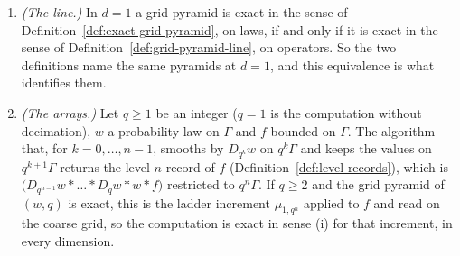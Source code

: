 \begin{proposition}
\label{prop:line-and-arrays}
\leanok
\begin{enumerate}
\item \emph{(The line.)} In $d = 1$ a grid pyramid is exact in the sense of
Definition~\ref{def:exact-grid-pyramid}, on laws, if and only if it is exact in the sense of
Definition~\ref{def:grid-pyramid-line}, on operators. So the two definitions name the same
pyramids at $d = 1$, and this equivalence is what identifies them.
\item \emph{(The arrays.)} Let $q \ge 1$ be an integer ($q = 1$ is the computation without decimation), $w$ a probability law on $\Gamma$ and $f$
bounded on $\Gamma$. The algorithm that, for $k = 0, \dots, n-1$, smooths by $D_{q^k}w$ on
$q^k\Gamma$ and keeps the values on $q^{k+1}\Gamma$ returns the level-$n$ record of $f$
(Definition~\ref{def:level-records}), which is
$\bigl(D_{q^{n-1}}w * \dots * D_qw * w * f\bigr)$ restricted to $q^n\Gamma$. If $q \ge 2$ and the
grid pyramid of $(w, q)$ is exact, this is the ladder increment $\mu_{1,q^n}$ applied to $f$ and read on the coarse
grid, so the computation is exact in sense (i) for that increment, in every dimension.
\end{enumerate}

\end{proposition}
